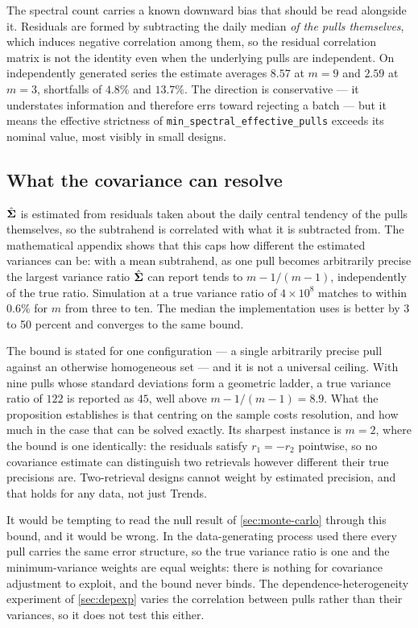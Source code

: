 \documentclass[12pt,a4paper,oneside]{article}
\begin{document}
The spectral count carries a known downward bias that should be read alongside
it. Residuals are formed by subtracting the daily median \emph{of the pulls
themselves}, which induces negative correlation among them, so the residual
correlation matrix is not the identity even when the underlying pulls are
independent. On independently generated series the estimate averages $8.57$ at
$m=9$ and $2.59$ at $m=3$, shortfalls of $4.8\%$ and $13.7\%$. The direction is
conservative --- it understates information and therefore errs toward rejecting a
batch --- but it means the effective strictness of
\texttt{min\_spectral\_effective\_pulls} exceeds its nominal value, most visibly
in small designs.

\subsection{What the covariance can resolve}\label{sec:resolution}

$\hat{\bm{\Sigma}}$ is estimated from residuals taken about the daily central tendency of
the pulls themselves, so the subtrahend is correlated with what it is subtracted
from. The mathematical appendix shows that this caps how different the estimated
variances can be: with a mean subtrahend, as one pull becomes arbitrarily precise
the largest variance ratio $\hat{\bm{\Sigma}}$ can report tends to $m-1/(m-1)$,
independently of the true ratio. Simulation at a true variance ratio of
$4\times10^{8}$ matches to within $0.6\%$ for $m$ from three to ten. The median
the implementation uses is better by 3 to 50 percent and converges to the same
bound.

The bound is stated for one configuration --- a single arbitrarily precise pull
against an otherwise homogeneous set --- and it is not a universal ceiling. With
nine pulls whose standard deviations form a geometric ladder, a true variance
ratio of $122$ is reported as $45$, well above $m-1/(m-1)=8.9$. What the
proposition establishes is that centring on the sample costs resolution, and how
much in the case that can be solved exactly. Its sharpest instance is $m=2$, where
the bound is one identically: the residuals satisfy $r_1=-r_2$ pointwise, so no
covariance estimate can distinguish two retrievals however different their true
precisions are. Two-retrieval designs cannot weight by estimated precision, and
that holds for any data, not just Trends.

It would be tempting to read the null result of \cref{sec:monte-carlo} through
this bound, and it would be wrong. In the data-generating process used there every
pull carries the same error structure, so the true variance ratio is one and the
minimum-variance weights are equal weights: there is nothing for covariance
adjustment to exploit, and the bound never binds. The dependence-heterogeneity
experiment of \cref{sec:depexp} varies the correlation between pulls rather than
their variances, so it does not test this either.
\end{document}
